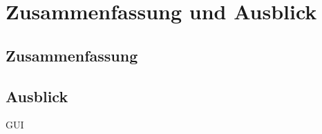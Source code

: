 \chapter{Zusammenfassung und Ausblick}\label{ch:zusammenfassung-und-ausblick}


\section{Zusammenfassung}\label{sec:zusammenfassung}

\section{Ausblick}\label{sec:ausblick}
GUI